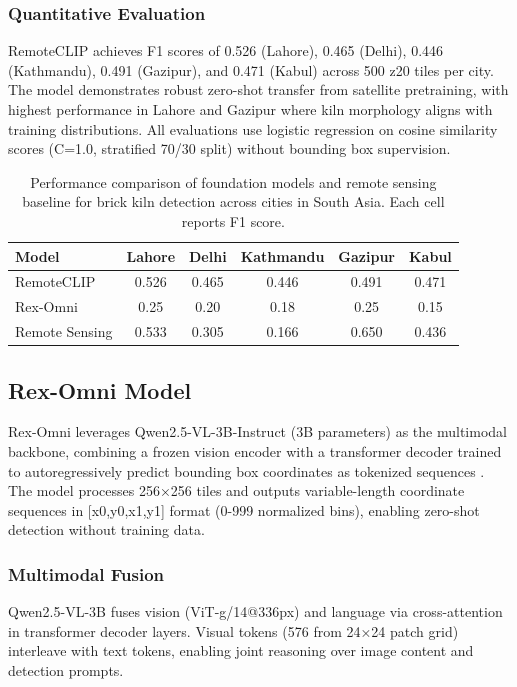 \documentclass{article}
\theoremstyle{plain}
\theoremstyle{definition}
\theoremstyle{remark}
\begin{document}
\subsubsection{Quantitative Evaluation}
RemoteCLIP achieves F1 scores of 0.526 (Lahore), 0.465 (Delhi), 0.446 (Kathmandu), 0.491 (Gazipur), and 0.471 (Kabul) across 500 z20 tiles per city. The model demonstrates robust zero-shot transfer from satellite pretraining, with highest performance in Lahore and Gazipur where kiln morphology aligns with training distributions. All evaluations use logistic regression on cosine similarity scores (C=1.0, stratified 70/30 split) without bounding box supervision.


\begin{table}[h]
\centering
\caption{Performance comparison of foundation models and remote sensing baseline for brick kiln detection across cities in South Asia. 
Each cell reports F1 score.}
\begin{tabular}{lccccc}
\toprule
Model & Lahore & Delhi & Kathmandu & Gazipur & Kabul \\
\midrule
RemoteCLIP & 0.526 & 0.465 & 0.446 & 0.491 & 0.471 \\
Rex-Omni & 0.25 & 0.20 & 0.18 & 0.25 & 0.15 \\
Remote Sensing &  0.533  &  0.305  &  0.166  &  0.650  &  0.436  \\
\bottomrule
\end{tabular}
\label{tab:foundationAndRemoteSensingResults}
\end{table}

\subsection{Rex-Omni Model}
Rex-Omni leverages Qwen2.5-VL-3B-Instruct (3B parameters) as the multimodal backbone, combining a frozen vision encoder with a transformer decoder trained to autoregressively predict bounding box coordinates as tokenized sequences \cite{mondal2024scalable}. The model processes 256×256 tiles and outputs variable-length coordinate sequences in [x0,y0,x1,y1] format (0-999 normalized bins), enabling zero-shot detection without training data.
\subsubsection{Multimodal Fusion} Qwen2.5-VL-3B fuses vision (ViT-g/14@336px) and language via cross-attention in transformer decoder layers. Visual tokens (576 from 24×24 patch grid) interleave with text tokens, enabling joint reasoning over image content and detection prompts. 
\end{document}
